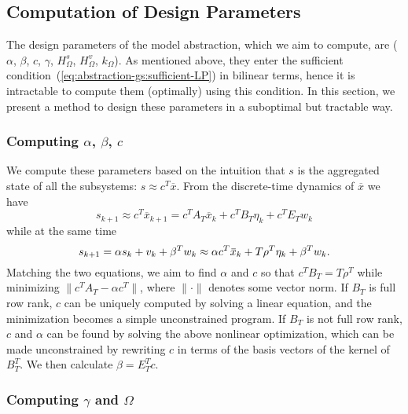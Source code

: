 \subsection{Computation of Design Parameters}
\label{sec:abstraction-gs:computation}

The design parameters of the model abstraction, which we aim to compute, are ($\alpha$, $\beta$, $c$, $\gamma$, $H_{\Omega}^{s}$, $H_{\Omega}^{v}$, $k_{\Omega}$).
As mentioned above, they enter the sufficient condition~(\cref{eq:abstraction-gs:sufficient-LP}) in bilinear terms, hence it is intractable to compute them (optimally) using this condition.
In this section, we present a method to design these parameters in a suboptimal but tractable way.

\subsubsection{Computing $\alpha$, $\beta$, $c$}
\label{sec:abstraction-gs:params:model}

We compute these parameters based on the intuition that $s$ is the aggregated state of all the subsystems: $s \approx c^{T} \overbar{x}$.
From the discrete-time dynamics of $\overbar{x}$ we have
\begin{equation*}
  s_{k+1} \approx c^{T} \overbar{x}_{k+1} = c^{T} A_{T} \overbar{x}_{k} + c^{T} B_{T} \eta_{k} + c^{T} E_{T} w_{k}
\end{equation*}
while at the same time 
\begin{equation*}
s_{k+1} = \alpha s_{k} + v_{k} + \beta^{T} w_{k} \approx \alpha c^{T} \overbar{x}_{k} + T \rho^{T} \eta_{k} + \beta^{T} w_{k} \text.
\end{equation*}
Matching the two equations, we aim to find $\alpha$ and $c$ so that
$c^{T} B_{T} = T \rho^{T}$
while minimizing $\| c^{T} A_{T} - \alpha c^{T} \|$, where $\|\cdot\|$ denotes some vector norm.
If $B_{T}$ is full row rank, $c$ can be uniquely computed by solving a linear equation, and the minimization becomes a simple unconstrained program.
If $B_{T}$ is not full row rank, $c$ and $\alpha$ can be found by solving the above nonlinear optimization, which can be made unconstrained by rewriting $c$ in terms of the basis vectors of the kernel of $B_{T}^{T}$.
We then calculate $\beta = E_{T}^{T} c$.


\subsubsection{Computing $\gamma$ and $\Omega$}
\label{sec:abstraction-gs:params:omega}

